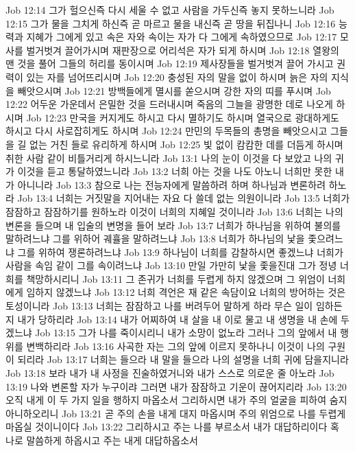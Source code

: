 Job 12:14  그가 헐으신즉 다시 세울 수 없고 사람을 가두신즉 놓지 못하느니라
Job 12:15  그가 물을 그치게 하신즉 곧 마르고 물을 내신즉 곧 땅을 뒤집나니
Job 12:16  능력과 지혜가 그에게 있고 속은 자와 속이는 자가 다 그에게 속하였으므로
Job 12:17  모사를 벌거벗겨 끌어가시며 재판장으로 어리석은 자가 되게 하시며
Job 12:18  열왕의 맨 것을 풀어 그들의 허리를 동이시며
Job 12:19  제사장들을 벌거벗겨 끌어 가시고 권력이 있는 자를 넘어뜨리시며
Job 12:20  충성된 자의 말을 없이 하시며 늙은 자의 지식을 빼앗으시며
Job 12:21  방백들에게 멸시를 쏟으시며 강한 자의 띠를 푸시며
Job 12:22  어두운 가운데서 은밀한 것을 드러내시며 죽음의 그늘을 광명한 데로 나오게 하시며
Job 12:23  만국을 커지게도 하시고 다시 멸하기도 하시며 열국으로 광대하게도 하시고 다시 사로잡히게도 하시며
Job 12:24  만민의 두목들의 총명을 빼앗으시고 그들을 길 없는 거친 들로 유리하게 하시며
Job 12:25  빛 없이 캄캄한 데를 더듬게 하시며 취한 사람 같이 비틀거리게 하시느니라
Job 13:1  나의 눈이 이것을 다 보았고 나의 귀가 이것을 듣고 통달하였느니라
Job 13:2  너희 아는 것을 나도 아노니 너희만 못한 내가 아니니라
Job 13:3  참으로 나는 전능자에게 말씀하려 하며 하나님과 변론하려 하노라
Job 13:4  너희는 거짓말을 지어내는 자요 다 쓸데 없는 의원이니라
Job 13:5  너희가 잠잠하고 잠잠하기를 원하노라 이것이 너희의 지혜일 것이니라
Job 13:6  너희는 나의 변론을 들으며 내 입술의 변명을 들어 보라
Job 13:7  너희가 하나님을 위하여 불의를 말하려느냐 그를 위하어 궤휼을 말하려느냐
Job 13:8  너희가 하나님의 낯을 좇으려느냐 그를 위하여 쟁론하려느냐
Job 13:9  하나님이 너희를 감찰하시면 좋겠느냐 너희가 사람을 속임 같이 그를 속이려느냐
Job 13:10  만일 가만히 낯을 좇을진대 그가 정녕 너희를 책망하시리니
Job 13:11  그 존귀가 너희를 두렵게 하지 않겠으며 그 위엄이 너희에게 임하지 않겠느냐
Job 13:12  너희 격언은 재 같은 속담이요 너희의 방어하는 것은 토성이니라
Job 13:13  너희는 잠잠하고 나를 버려두어 말하게 하라 무슨 일이 임하든지 내가 당하리라
Job 13:14  내가 어찌하여 내 살을 내 이로 물고 내 생명을 내 손에 두겠느냐
Job 13:15  그가 나를 죽이시리니 내가 소망이 없노라 그러나 그의 앞에서 내 행위를 변백하리라
Job 13:16  사곡한 자는 그의 앞에 이르지 못하나니 이것이 나의 구원이 되리라
Job 13:17  너희는 들으라 내 말을 들으라 나의 설명을 너희 귀에 담을지니라
Job 13:18  보라 내가 내 사정을 진술하였거니와 내가 스스로 의로운 줄 아노라
Job 13:19  나와 변론할 자가 누구이랴 그러면 내가 잠잠하고 기운이 끊어지리라
Job 13:20  오직 내게 이 두 가지 일을 행하지 마옵소서 그리하시면 내가 주의 얼굴을 피하여 숨지 아니하오리니
Job 13:21  곧 주의 손을 내게 대지 마옵시며 주의 위엄으로 나를 두렵게 마옵실 것이니이다
Job 13:22  그리하시고 주는 나를 부르소서 내가 대답하리이다 혹 나로 말씀하게 하옵시고 주는 내게 대답하옵소서
